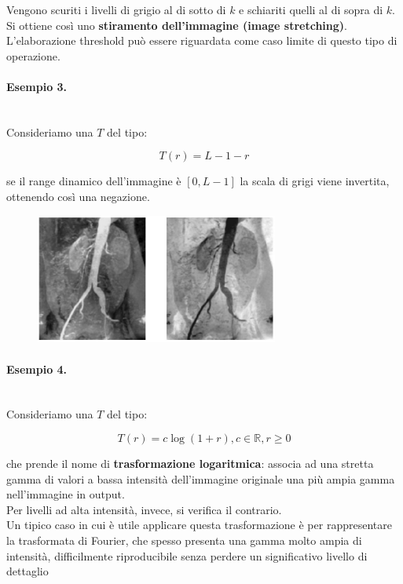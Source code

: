 Vengono scuriti i livelli di grigio al di sotto di $k$ e schiariti quelli al
di sopra di $k$. Si ottiene così uno \textbf{stiramento dell'immagine (image
    stretching)}. L'elaborazione threshold può essere riguardata come
caso limite di questo tipo di operazione.

\paragraph{Esempio 3.}\ \\

Consideriamo una $T$ del tipo:

$$
    T(r) = L - 1 - r
$$

se il range dinamico dell'immagine è $[0, L - 1]$
la scala di grigi viene invertita, ottenendo così una negazione.

\begin{figure}[H]
    \centering
    \includegraphics[width=8cm, keepaspectratio]{capitoli/immagini/imgs/angiografie_esempio_3.jpg}
\end{figure}

\paragraph{Esempio 4.}\ \\

Consideriamo una $T$ del tipo:

$$
    T(r) = c \log(1 + r), c \in  \mathbb{R}, r \geq 0
$$

che prende il nome di \textbf{trasformazione logaritmica}: associa ad una
stretta gamma di valori a bassa intensità dell'immagine originale
una più ampia gamma nell'immagine in output.\\
Per livelli ad alta intensità, invece, si verifica il contrario.\\
Un tipico caso in cui è utile applicare questa trasformazione è per
rappresentare la trasformata di Fourier, che spesso presenta una
gamma molto ampia di intensità, difficilmente riproducibile senza
perdere un significativo livello di dettaglio

